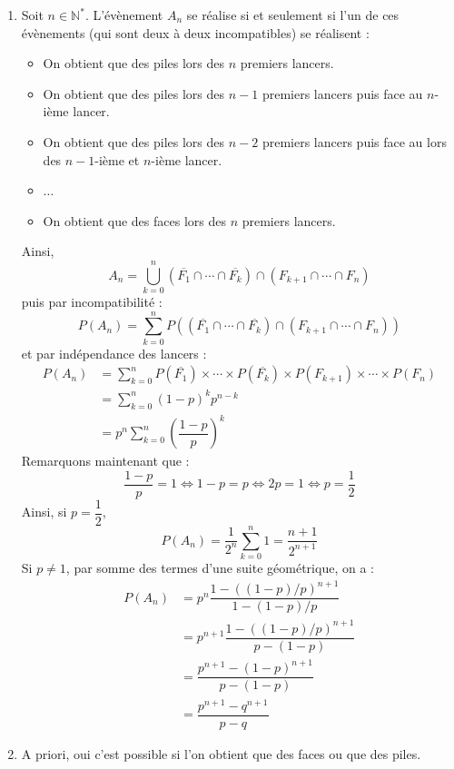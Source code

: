 \documentclass[a4paper,10pt]{report}
\begin{document}
\begin{enumerate}
\item Soit $n \in \mathbb{N}^*$. L'évènement $A_n$ se réalise si et seulement si l'un de ces évènements (qui sont deux à deux incompatibles) se réalisent :
\begin{itemize}
\item On obtient que des piles lors des $n$ premiers lancers.
\item On obtient que des piles lors des $n-1$ premiers lancers puis face au $n$-ième lancer.
\item On obtient que des piles lors des $n-2$ premiers lancers puis face au lors des $n-1$-ième et $n$-ième lancer.
\item $\ldots$
\item On obtient que des faces lors des $n$ premiers lancers.
\end{itemize}
Ainsi,
$$ A_n =\bigcup_{k=0}^n (\overline{F_1} \cap \cdots \cap \overline{F_k}) \cap (F_{k+1} \cap \cdots \cap F_n)$$
puis par incompatibilité :
$$ P(A_n) = \sum_{k=0}^n P( (\overline{F_1} \cap \cdots \cap \overline{F_k}) \cap (F_{k+1} \cap \cdots \cap F_n))$$
et par indépendance des lancers :
\begin{align*}
 P(A_n) & = \sum_{k=0}^n P(\overline{F_1}) \times \cdots \times P(\overline{F_k}) \times P(F_{k+1}) \times \cdots \times P( F_n) \\
 & = \sum_{k=0}^n  (1-p)^k p^{n-k} \\
 & = p^{n} \sum_{k=0}^n \left( \dfrac{1-p}{p} \right)^k 
 \end{align*}
Remarquons maintenant que :
$$\dfrac{1-p}{p} = 1 \Longleftrightarrow 1-p=p \Longleftrightarrow 2p=1 \Longleftrightarrow p = \dfrac{1}{2}$$
Ainsi, si $p = \dfrac{1}{2}$,
$$ P(A_n) = \dfrac{1}{2^{n}} \sum_{k=0}^n 1 = \dfrac{n+1}{2^{n+1}}$$
Si $p \neq 1$, par somme des termes d'une suite géométrique, on a :
\begin{align*}
P(A_n) & = p^n \dfrac{1-((1-p)/p)^{n+1}}{1-(1-p)/p} \\
& = p^{n+1} \dfrac{1-((1-p)/p)^{n+1}}{p-(1-p)} \\
& = \dfrac{p^{n+1}-(1-p)^{n+1}}{p-(1-p)} \\
& = \dfrac{p^{n+1}-q^{n+1}}{p-q}
\end{align*}
\item A priori, oui c'est possible si l'on obtient que des faces ou que des piles. 

\medskip


\end{enumerate}
\end{document}
